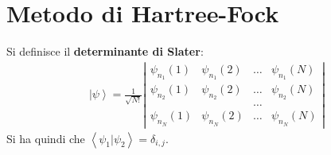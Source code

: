 \section{Metodo di Hartree-Fock} %
Si definisce il \textbf{determinante di Slater}:
\begin{equation}\begin{split}
\left |\psi  \right\rangle=\frac{1}{\sqrt{N!}}\left|\begin{matrix}
\psi _{n_1}\left(1\right)&\psi _{n_1}\left(2\right)&\dots&\psi _{n_1}\left(N\right)\\
\psi _{n_2}\left(1\right)&\psi _{n_2}\left(2\right)&\dots&\psi _{n_2}\left(N\right)\\
&&\dots& \\
\psi _{n_N}\left(1\right)&\psi _{n_N}\left(2\right)&\dots&\psi _{n_N}\left(N\right)
\end{matrix}\right|
\end{split}\end{equation}
Si ha quindi che $\left\langle \psi _1|\psi _2 \right\rangle=\delta_{i,j}$.

